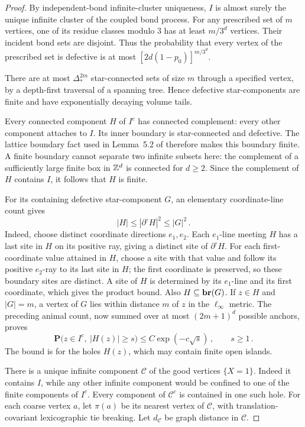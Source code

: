 \documentclass[12pt]{amsart}
\begin{document}
\begin{proof}
By independent-bond infinite-cluster uniqueness, $I$ is almost surely the unique infinite cluster of the coupled bond process. For any prescribed set of $m$ vertices, one of its residue classes modulo $3$ has at least $m/3^d$ vertices. Their incident bond sets are disjoint. Thus the probability that every vertex of the prescribed set is defective is at most $[2d(1-p_0)]^{m/3^d}$.

There are at most $\Delta_*^{2m}$ star-connected sets of size $m$ through a specified vertex, by a depth-first traversal of a spanning tree. Hence defective star-components are finite and have exponentially decaying volume tails.

Every connected component $H$ of $I^c$ has connected complement: every other component attaches to $I$. Its inner boundary is star-connected and defective. The lattice boundary fact used in Lemma~5.2 of \cite{mathieu2008quenched} therefore makes this boundary finite. A finite boundary cannot separate two infinite subsets here: the complement of a sufficiently large finite box in $\mathbb{Z}^d$ is connected for $d\geq2$. Since the complement of $H$ contains $I$, it follows that $H$ is finite.

For its containing defective star-component $G$, an elementary coordinate-line count gives
\begin{equation*}
 |H|\leq|\partial^\circ H|^2\leq|G|^2\,.
\end{equation*}
Indeed, choose distinct coordinate directions $e_1,e_2$. Each $e_1$-line meeting $H$ has a last site in $H$ on its positive ray, giving a distinct site of $\partial^\circ H$. For each first-coordinate value attained in $H$, choose a site with that value and follow its positive $e_2$-ray to its last site in $H$; the first coordinate is preserved, so these boundary sites are distinct. A site of $H$ is determined by its $e_1$-line and its first coordinate, which gives the product bound. Also $H\subseteq\mathbf{br}(G)$. If $z\in H$ and $|G|=m$, a vertex of $G$ lies within distance $m$ of $z$ in the $\ell_\infty$ metric. The preceding animal count, now summed over at most $(2m+1)^d$ possible anchors, proves
\begin{equation*}
 \mathbf P\bigl(z\in I^c,\ |H(z)|\geq s\bigr)
 \leq C\exp(-c\sqrt{s})\,,\qquad s\geq1\,.
\end{equation*}
The bound is for the holes $H(z)$, which may contain finite open islands.

There is a unique infinite component $\mathcal C$ of the good vertices $\{X=1\}$. Indeed it contains $I$, while any other infinite component would be confined to one of the finite components of $I^c$. Every component of $\mathcal C^c$ is contained in one such hole. For each coarse vertex $a$, let $\pi(a)$ be its nearest vertex of $\mathcal C$, with translation-covariant lexicographic tie breaking. Let $d_{\mathcal C}$ be graph distance in $\mathcal C$.


\end{proof}
\end{document}
